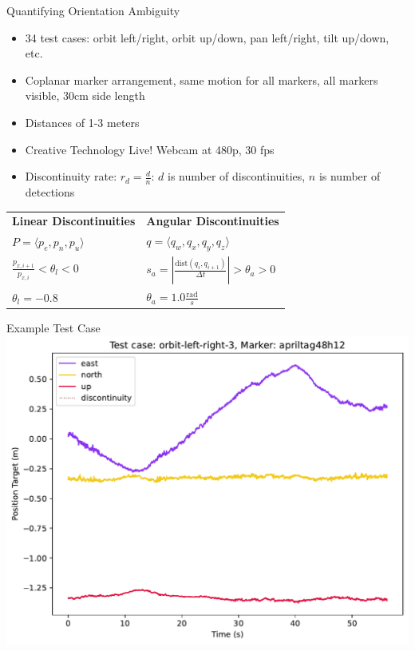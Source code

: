 \documentclass[aspectratio=169]{beamer}
\newif\ifpause
\newcommand{\mypause}{\ifpause \pause \fi}
\begin{document}
\begin{frame}{Quantifying Orientation Ambiguity}
	\centering
	\begin{itemize}
		\item 34 test cases: orbit left/right, orbit up/down, pan left/right, tilt up/down, etc.\mypause
		\item Coplanar marker arrangement, same motion for all markers, all markers visible, 30cm side length\mypause
		\item Distances of 1-3 meters\mypause
		\item Creative Technology Live! Webcam at 480p, 30 fps
		\item Discontinuity rate: $r_d = \frac{d}{n}$: $d$ is number of discontinuities, $n$ is number of detections
	\end{itemize}
	\begin{tabular}{ll}
		\textbf{Linear Discontinuities} & \textbf{Angular Discontinuities}\\
		$P = \langle p_e, p_n, p_u \rangle$ & $q = \langle q_w, q_x, q_y, q_z \rangle$\\
		$\frac{p_{x,i+1}}{p_{x,i}} < \theta_l < 0$ & $s_a = \left| \frac{\mathrm{dist} \left( q_i, q_{i+1} \right) }{\Delta t} \right| > \theta_a > 0$\\
		$\theta_l = -0.8$ & $\theta_a = 1.0 \frac{\mathrm{rad}}{s}$
	\end{tabular}
\end{frame}


\begin{frame}{Example Test Case}
	\centering
	\includegraphics[width=0.75\linewidth]{images/orbit-left-right-3_apriltag48h12_position-target}
\end{frame}
\end{document}

